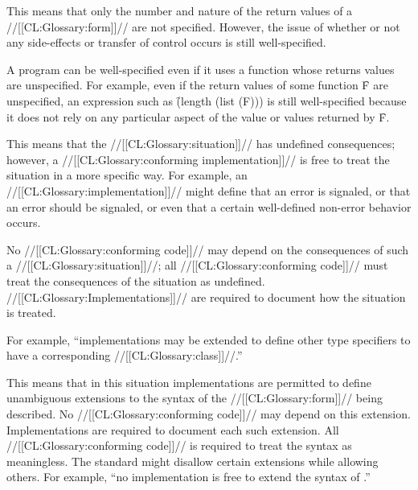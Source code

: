 %

This means that only the number and nature of the return values of a
//[[CL:Glossary:form]]// are not specified.  However, the issue of whether or not
any side-effects or transfer of control occurs is still well-specified.

A program can be well-specified even if it uses a function whose
returns values are unspecified.  For example, even if the return
values of some function \f{F} are unspecified, an expression such as
\f{(length (list (F)))} is still well-specified because it does not
rely on any particular aspect of the value or values returned by \f{F}.

%

This means that the //[[CL:Glossary:situation]]// has undefined consequences;
however, a //[[CL:Glossary:conforming implementation]]// is free to treat
the situation in a more specific way.  
For example, an //[[CL:Glossary:implementation]]// might define 
    that      an error is signaled,
 or that      an error should be signaled,
 or even that a certain well-defined non-error behavior occurs.


No //[[CL:Glossary:conforming code]]// may depend on the consequences of such a //[[CL:Glossary:situation]]//;
all //[[CL:Glossary:conforming code]]// must treat the consequences of the situation
as undefined. //[[CL:Glossary:Implementations]]// are required to document how the
situation is treated.

For example, ``implementations may be extended to define other type
specifiers to have a corresponding //[[CL:Glossary:class]]//.''

%

This means that in this situation implementations are permitted to
define unambiguous extensions to the syntax of the //[[CL:Glossary:form]]// being
described.  No //[[CL:Glossary:conforming code]]// may depend on this extension.
Implementations are required to document each such extension. All
//[[CL:Glossary:conforming code]]// is required to treat the syntax as meaningless. The
standard might disallow certain extensions while allowing others. For
example, ``no implementation is free to extend the syntax of
.''
                          
%
         
